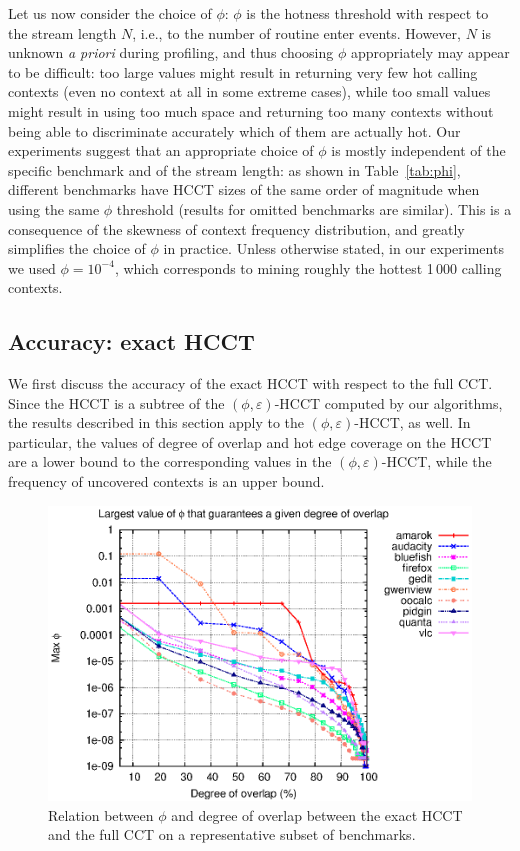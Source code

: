 \documentclass{sigplanconf}
\begin{document}
Let us now consider the choice of $\phi$: $\phi$ is the hotness threshold with respect to the stream length $N$, i.e., to the number of routine enter events. However, $N$ is unknown {\em a priori} during profiling, and thus choosing $\phi$ appropriately may appear to be difficult: too large values might result in returning very few hot calling contexts (even no context at all in some extreme cases), while too small values might result in using too much space and returning too many contexts without being able to discriminate accurately which of them are actually hot. Our experiments suggest that an appropriate choice of $\phi$ is mostly independent of the specific benchmark and of the stream length: as shown in Table~\ref{tab:phi}, different benchmarks have HCCT sizes of the same order of magnitude when using the same $\phi$ threshold (results for omitted benchmarks are similar). This is a consequence of the skewness of context frequency distribution, and greatly simplifies the choice of $\phi$ in practice. Unless otherwise stated, in  our experiments we used $\phi=10^{-4}$, which corresponds to mining roughly the hottest 1\,000 calling contexts.

\subsection{Accuracy: exact HCCT}
\label{ss:accuracy-hcct}

We first discuss the accuracy of the exact HCCT with respect to the full CCT. Since the HCCT is a subtree of the $(\phi,\varepsilon)$-HCCT computed by our algorithms, the results described in this section apply to the $(\phi,\varepsilon)$-HCCT, as well. In particular, the values of degree of overlap and hot edge coverage on the HCCT are a lower bound to the corresponding values in the  $(\phi,\varepsilon)$-HCCT, while the frequency of uncovered contexts is an upper bound.

\begin{figure}[t]
\center\includegraphics[width=\columnwidth]{charts/maxphi.eps}
\caption{Relation between $\phi$ and degree of overlap between the exact HCCT and the full CCT on a representative subset of benchmarks.}
\label{fig:degreeOfOverlap}
\end{figure}
\end{document}
